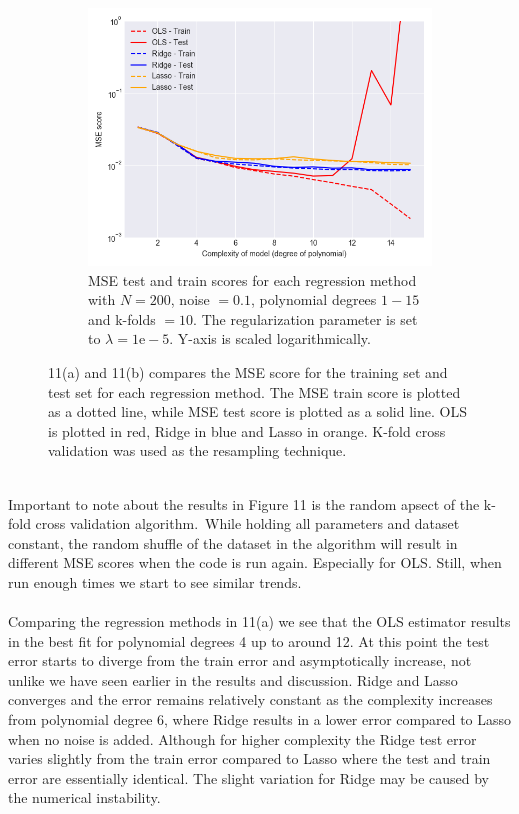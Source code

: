 \documentclass[a4paper,twocolumn]{article}
\begin{document}
\begin{figure}[ht]
    \begin{subfigure}[b]{0.9\columnwidth}
        \includegraphics[width=\columnwidth]{OLS_Ridge_Lasso_comparison_Lambda=1e-05_N=200_Noise=0.1_Degree=1-15.png}
        \caption{MSE test and train scores for each regression method with $N = 200$, noise $= 0.1$, polynomial degrees $1- 15$ and k-folds $= 10$. The regularization parameter is set to $\lambda = 1\textrm{e}-5$. Y-axis is scaled logarithmically.}
    \end{subfigure}
    \caption{11(a) and 11(b) compares the MSE score for the training set and test set for each regression method. The MSE train score is plotted as a dotted line, while MSE test score is plotted as a solid line. OLS is plotted in red, Ridge in blue and Lasso in orange. K-fold cross validation was used as the resampling technique.}
\end{figure}\\
Important to note about the results in Figure 11 is the random apsect of the k-fold cross validation algorithm.\ While holding all parameters and dataset constant, the random shuffle of the dataset in the algorithm will result in different MSE scores when the code is run again. Especially for OLS. Still, when run enough times we start to see similar trends.\\
\\
Comparing the regression methods in 11(a) we see that the OLS estimator results in the best fit for polynomial degrees 4 up to around 12. At this point the test error starts to diverge from the train error and asymptotically increase, not unlike we have seen earlier in the results and discussion. Ridge and Lasso converges and the error remains relatively constant as the complexity increases from polynomial degree 6, where Ridge results in a lower error compared to Lasso when no noise is added. Although for higher complexity the Ridge test error varies slightly from the train error compared to Lasso where the test and train error are essentially identical. The slight variation for Ridge may be caused by the numerical instability. \\
\end{document}
